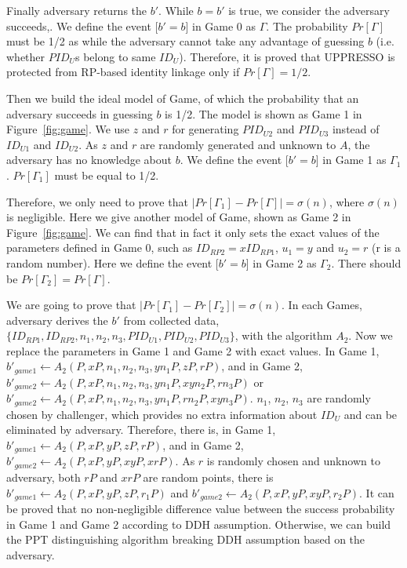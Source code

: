 Finally adversary returns the $b'$. While $b=b'$ is true, we consider the adversary succeeds,.
We define the event [$b'=b$] in Game 0 as $\Gamma$. The probability $Pr[\Gamma]$ must be 1/2 as while the adversary cannot take any advantage of guessing $b$ (i.e.  whether $PID_U$s belong to same $ID_U$). Therefore, it is proved that UPPRESSO is protected from RP-based identity linkage only if $Pr[\Gamma]=1/2$.

Then we build the ideal model of Game, of which the probability  that an adversary succeeds in guessing $b$ is 1/2. The model is shown as Game 1 in Figure~\ref{fig:game}. We use $z$ and $r$ for generating $PID_{U2}$ and $PID_{U3}$ instead of $ID_{U1}$ and $ID_{U2}$. As $z$ and $r$ are randomly generated and unknown to $A$, the adversary has no knowledge about $b$. We  define the event [$b'=b$] in Game 1 as $\Gamma_1$. $Pr[\Gamma_1]$ must be equal to 1/2. 

Therefore, we only need to prove that $|Pr[\Gamma_1]-Pr[\Gamma]|=\sigma(n)$, where $\sigma(n)$ is negligible. Here we give another model of Game, shown as Game 2 in Figure~\ref{fig:game}. We can find that in fact it only sets the exact values of the parameters defined in Game 0, such as $ID_{RP2}=xID_{RP1}$, $u_1=y$ and $u_2=r$ (r is a random number).  Here we define the event [$b'=b$] in Game 2 as $\Gamma_2$. There should be $Pr[\Gamma_2]=Pr[\Gamma]$.

We are going to prove that $|Pr[\Gamma_1]-Pr[\Gamma_2]|=\sigma(n)$. In each Games, adversary derives the $b'$ from collected data, $\{ID_{RP1},ID_{RP2},n_1,n_2,n_3,PID_{U1},PID_{U2},PID_{U3}\}$, with the algorithm $A_2$. Now we replace the parameters in Game 1 and Game 2 with exact values. In Game 1, $b'_{game1}\gets A_2(P,xP,n_1,n_2,n_3,yn_1P,zP,rP)$, and in Game 2, $b'_{game2}\gets A_2(P,xP,n_1,n_2,n_3,yn_1P,xyn_2P,rn_3P)$ or $b'_{game2}\gets A_2(P,xP,n_1,n_2,n_3,yn_1P,rn_2P,xyn_3P)$. 
$n_1$, $n_2$, $n_3$ are randomly chosen by challenger, which provides no extra information about $ID_U$ and can be eliminated by adversary. Therefore, there is, in Game 1, $b'_{game1}\gets A_2(P,xP,yP,zP,rP)$, and in Game 2, $b'_{game2}\gets A_2(P,xP,yP,xyP,xrP)$. As $r$ is randomly chosen and unknown to adversary, both $rP$ and $xrP$ are random points, there is $b'_{game1}\gets A_2(P,xP,yP,zP,r_1P)$ and $b'_{game2}\gets A_2(P,xP,yP,xyP,r_2P)$.  It can be proved that no non-negligible difference value between the success probability in Game 1 and Game 2 according to DDH assumption. Otherwise, we can build the PPT distinguishing algorithm breaking DDH assumption based on the adversary. 

